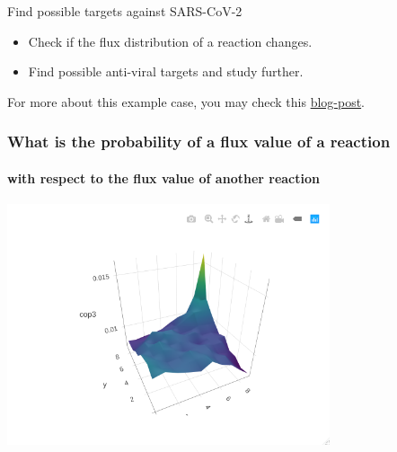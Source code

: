 \documentclass{beamer}
\begin{document}
\begin{frame}{Find possible targets against SARS-CoV-2}
      \begin{itemize}
         \item Check if the flux distribution of a reaction changes.
         \item Find possible anti-viral targets and study further.
      \end{itemize}
      \vspace*{0.2cm}

      For more about this example case, you may check this \href{https://www.tweag.io/blog/2021-07-14-metabolic-networks/}{blog-post}.

   \end{frame}

   \begin{frame}
      \frametitle{What is the probability of a flux value of a reaction}
      \framesubtitle{with respect to the flux value of another reaction}
      \centering
      \includegraphics[width=95mm]{resources/hex_-_g6pper_transp.png}
   \end{frame}
\end{document}
